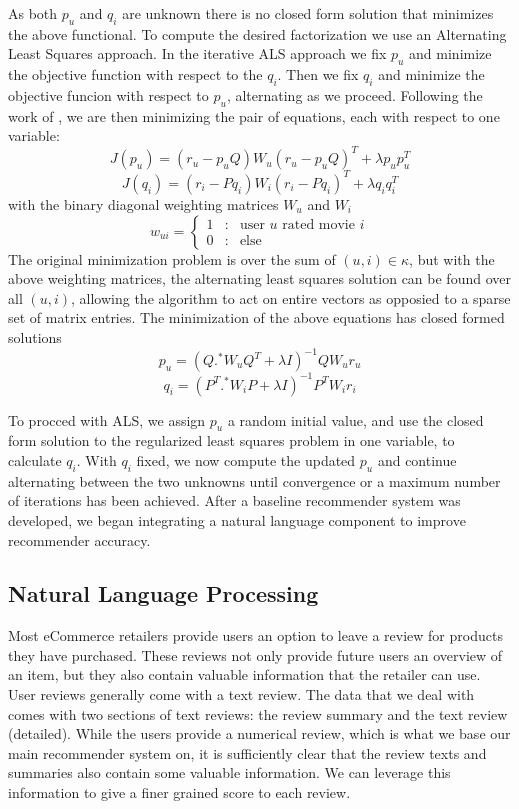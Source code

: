 \documentclass{article} %
\begin{document}
As both $p_u$ and $q_i$  are unknown there is no closed form solution that minimizes the above functional. To compute the desired factorization we use an Alternating Least Squares approach. In the iterative ALS approach we fix $p_u$ and minimize the objective function with respect to the $q_i$. Then we fix $q_i$ and minimize the objective funcion with respect to $p_u$, alternating as we proceed. Following the work of \cite{Yeung:2010:Online}, we are then minimizing the pair of equations, each with respect to one variable: 
\[ J(p_u) = (r_u - p_u Q) W_u (r_u - p_u Q)^T + \lambda p_u p_u^T \] 
\[ J(q_i) = (r_i - P q_i) W_i (r_i - P q_i)^T + \lambda q_i q_i^T \]
with the binary diagonal weighting matrices $W_u$ and $W_i$ 
\[
   w_{ui} = \left\{
     \begin{array}{lll}
       1 &: &\text{user } u \text{ rated movie } i \\
       0 &: &\text{else}
     \end{array}
   \right.
\]
The original minimization problem is over the sum of $(u,i) \in \kappa$, but with the above weighting matrices, the alternating least squares solution can be found over all $(u,i)$, allowing the algorithm to act on entire vectors as opposied to a sparse set of matrix entries. The minimization of the above equations has closed formed solutions
\[ p_u = (Q .^* W_u Q^T + \lambda I)^{-1} Q W_u r_u \] 
\[ q_i = (P^T .^* W_i P + \lambda I)^{-1} P^T W_i r_i \] 

To procced with ALS, we assign $p_u$ a random initial value, and use the closed form solution to the regularized least squares problem in one variable, to calculate $q_i$. With $q_i$ fixed, we now compute the updated $p_u$ and continue alternating between the two unknowns until convergence or a maximum number of iterations has been achieved. After a baseline recommender system was developed, we began integrating a natural language component to improve recommender accuracy. 


\subsection{Natural Language Processing}

Most eCommerce retailers provide users an option to leave a review for products they have purchased. These reviews not only provide future users an overview of an item, but they also contain valuable information that the retailer can use. User reviews generally come with a text review. The data that we deal with comes with two sections of text reviews: the review summary and the text review (detailed). While the users provide a numerical review, which is what we base our main recommender system on, it is sufficiently clear that the review texts and summaries also contain some valuable information. We can  leverage this information to give a finer grained score to each review. 
\end{document}
